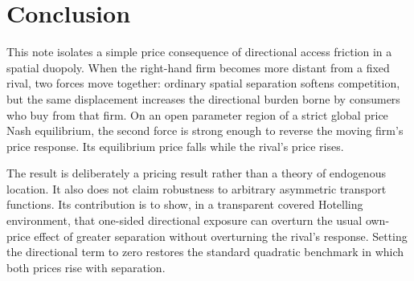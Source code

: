 \section{Conclusion}\label{sec:conclusion}

This note isolates a simple price consequence of directional access friction in a spatial duopoly. When the right-hand firm becomes more distant from a fixed rival, two forces move together: ordinary spatial separation softens competition, but the same displacement increases the directional burden borne by consumers who buy from that firm. On an open parameter region of a strict global price Nash equilibrium, the second force is strong enough to reverse the moving firm's price response. Its equilibrium price falls while the rival's price rises.

The result is deliberately a pricing result rather than a theory of endogenous location. It also does not claim robustness to arbitrary asymmetric transport functions. Its contribution is to show, in a transparent covered Hotelling environment, that one-sided directional exposure can overturn the usual own-price effect of greater separation without overturning the rival's response. Setting the directional term to zero restores the standard quadratic benchmark in which both prices rise with separation.